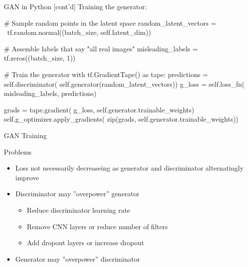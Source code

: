 \documentclass[ignorenonframetext,xcolor=x11names]{beamer}
\begin{document}
\begin{frame}[fragile]{GAN in Python \small [cont'd]}
Training the generator:
\begin{pythoncode}
        # Sample random points in the latent space
        random_latent_vectors = \
            tf.random.normal((batch_size, self.latent_dim))

        # Assemble labels that say "all real images"
        misleading_labels = tf.zeros((batch_size, 1))

        # Train the generator 
        with tf.GradientTape() as tape:
            predictions = self.discriminator(
                self.generator(random_latent_vectors))
            g_loss = self.loss_fn(
                misleading_labels, predictions)

        grads = tape.gradient(
            g_loss, 
            self.generator.trainable_weights)
        self.g_optimizer.apply_gradients(
            zip(grads, self.generator.trainable_weights))
\end{pythoncode}
\end{frame}


\begin{frame}{GAN Training}

\begin{block}{Problems}

\begin{itemize}
   \item Loss not necessarily decreaseing as generator and discriminator alternatingly improve
   \item Discriminator may ''overpower'' generator
   \begin{itemize}
       \item Reduce discriminator learning rate
       \item Remove CNN layers or reduce number of filters
       \item Add dropout layers or increase dropout
   \end{itemize}
   \item Generator may ''overpower'' discriminator
\end{itemize}
\end{block}
\end{frame}
\end{document}
